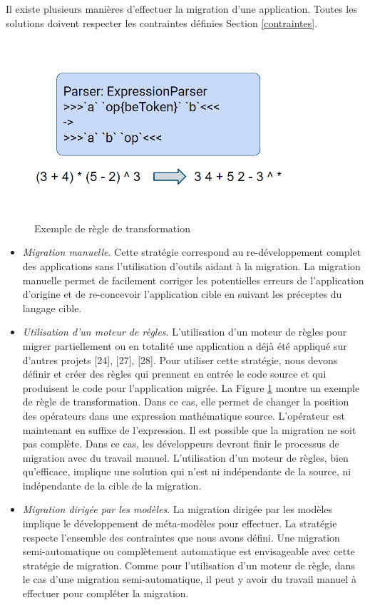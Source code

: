 \documentclass[11pt,]{article}
\providecommand{\tightlist}{%
  \setlength{\itemsep}{0pt}\setlength{\parskip}{0pt}}
\begin{document}
Il existe plusieurs manières d'effectuer la migration d'une application.
Toutes les solutions doivent respecter les contraintes définies Section
\ref{contraintes}.

\hypertarget{exampleRuleEngine}{%
\begin{figure}
\centering
\includegraphics[width=3.64583in,height=2.60417in]{figures/exampleRuleEngine.png}
\caption{Exemple de règle de transformation}\label{exampleRuleEngine}
\end{figure}
}

\begin{itemize}
\tightlist
\item
  \emph{Migration manuelle}. Cette stratégie correspond au
  re-développement complet des applications sans l'utilisation d'outils
  aidant à la migration. La migration manuelle permet de facilement
  corriger les potentielles erreurs de l'application d'origine et de
  re-concevoir l'application cible en suivant les préceptes du langage
  cible.\\
\item
  \emph{Utilisation d'un moteur de règles}. L'utilisation d'un moteur de
  règles pour migrer partiellement ou en totalité une application a déjà
  été appliqué sur d'autres projets {[}24{]}, {[}27{]}, {[}28{]}. Pour
  utiliser cette stratégie, nous devons définir et créer des règles qui
  prennent en entrée le code source et qui produisent le code pour
  l'application migrée. La Figure \ref{exampleRuleEngine} montre un
  exemple de règle de transformation. Dans ce cas, elle permet de
  changer la position des opérateurs dans une expression mathématique
  source. L'opérateur est maintenant en suffixe de l'expression. Il est
  possible que la migration ne soit pas complète. Dans ce cas, les
  développeurs devront finir le processus de migration avec du travail
  manuel. L'utilisation d'un moteur de règles, bien qu'efficace,
  implique une solution qui n'est ni indépendante de la source, ni
  indépendante de la cible de la migration.
\item
  \emph{Migration dirigée par les modèles}. La migration dirigée par les
  modèles implique le développement de méta-modèles pour effectuer. La
  stratégie respecte l'ensemble des contraintes que nous avons défini.
  Une migration semi-automatique ou complètement automatique est
  envisageable avec cette stratégie de migration. Comme pour
  l'utilisation d'un moteur de règle, dans le cas d'une migration
  semi-automatique, il peut y avoir du travail manuel à effectuer pour
  compléter la migration.
\end{itemize}
\end{document}

